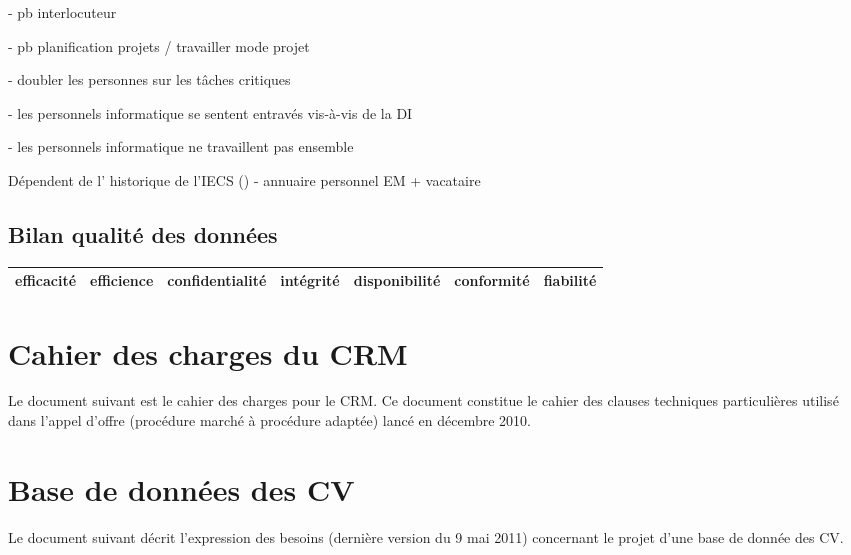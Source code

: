 \documentclass{book}
\begin{document}
 - pb interlocuteur

- pb planification projets / travailler mode projet 

- doubler les personnes sur les tâches critiques

- les personnels informatique se sentent entravés vis-à-vis de la DI

- les personnels informatique ne travaillent pas ensemble

Dépendent de l' historique de l'IECS (\CK)
- annuaire personnel EM + vacataire

\section{Bilan qualité des données}

	\begin{tabular}{|l|l|l|l|l|l|l|}
	\hline
	efficacité	& efficience &	confidentialité	& intégrité & disponibilité & conformité & fiabilité \\
	\hline
	
	\hline
	\end{tabular}
	


\appendix

\printindex

\chapter{Cahier des charges du CRM}
\label{ch:annexe-crm}

Le document suivant est le cahier des charges pour le CRM.
Ce document constitue le cahier des clauses techniques particulières
utilisé dans l'appel d'offre (procédure marché à procédure adaptée)
lancé en décembre 2010. 




\chapter{Base de données des CV}
\label{ch:rh-cvtheque}

Le document suivant décrit l'expression des besoins (dernière version du 9 mai 2011)
concernant le projet d'une base de donnée des CV.



\end{document}
